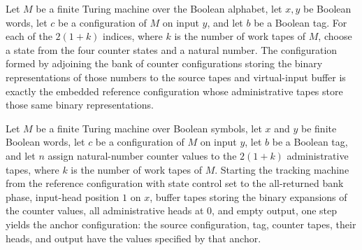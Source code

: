 \begin{lemma}
\label{Complexity.clTrack_frame}
\leanok
{}
Let $M$ be a finite Turing machine over the Boolean alphabet, let $x,y$ be Boolean
words, let $c$ be a configuration of $M$ on input $y$, and let $b$ be a Boolean tag. For
each of the $2(1+k)$ indices, where $k$ is the number of work tapes of $M$, choose a
state from the four counter states and a natural number. The configuration formed by
adjoining the bank of counter configurations storing the binary representations of those
numbers to the source tapes and virtual-input buffer is exactly the embedded reference
configuration whose administrative tapes store those same binary representations.
\end{lemma}

\begin{lemma}
\label{Complexity.clTrack_dispatch}
\leanok
{}
Let $M$ be a finite Turing machine over Boolean symbols, let $x$ and $y$ be finite
Boolean words, let $c$ be a configuration of $M$ on input $y$, let $b$ be a Boolean tag,
and let $n$ assign natural-number counter values to the $2(1+k)$ administrative tapes,
where $k$ is the number of work tapes of $M$. Starting the tracking machine from the
reference configuration with state control set to the all-returned bank phase,
input-head position $1$ on $x$, buffer tapes storing the binary expansions of the
counter values, all administrative heads at $0$, and empty output, one step yields the
anchor configuration: the source configuration, tag, counter tapes, their heads, and
output have the values specified by that anchor.
\end{lemma}

